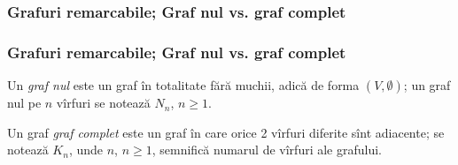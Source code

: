 \begin{frame}
  \frametitle{Grafuri remarcabile; Graf nul vs. graf complet}

\begin{figure}
\centering%
\end{figure}

\begin{figure}
\centering%
\end{figure}

\end{frame}

\begin{frame}
  \frametitle{Grafuri remarcabile; Graf nul vs. graf complet}

\begin{definition}
Un \emph{graf nul} este un graf în totalitate fără muchii, adică de forma $(V,\emptyset)$; 
un graf nul pe $n$ vîrfuri se notează $N_n$, $n\geq 1$.
\end{definition}

\begin{definition}
Un graf \emph{graf complet} este un graf în care orice 2 vîrfuri diferite sînt adiacente; 
se notează $K_n$, unde $n$, $n\geq 1$, semnifică numarul de vîrfuri ale grafului.
\end{definition}

\end{frame}

